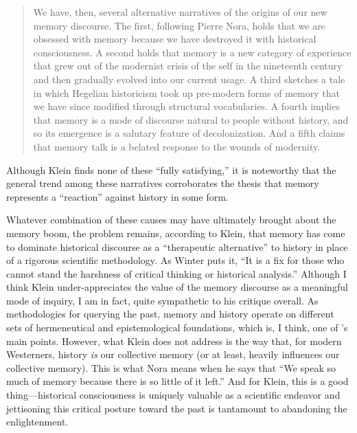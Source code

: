 \begin{quote} We have, then, several alternative narratives of the origins of our new memory discourse. The first, following Pierre Nora, holds that we are obsessed with memory because we have destroyed it with historical consciousness. A second holds that memory is a new category of experience that grew out of the modernist crisis of the self in the nineteenth century and then gradually evolved into our current usage. A third sketches a tale in which Hegelian historicism took up pre-modern forms of memory that we have since modified through structural vocabularies. A fourth implies that memory is a mode of discourse natural to people without history, and so its emergence is a salutary feature of decolonization. And a fifth claims that memory talk is a belated response to the wounds of modernity.\autocite[134]{klein_klein2011} \end{quote}  

Although Klein finds none of these ``fully satisfying,'' it is noteworthy that the general trend among these narratives corroborates the thesis that memory represents a ``reaction'' against history in some form.  

Whatever combination of these causes may have ultimately brought about the memory boom, the problem remains, according to Klein, that memory has come to dominate historical discourse as a ``therapeutic alternative'' to history in place of a rigorous scientific methodology.\autocite[137]{klein2011} As Winter puts it, ``It is a fix for those who cannot stand the harshness of critical thinking or historical analysis.''\autocite[283 (summarizing Klein)]{winter2006} Although I think Klein under-appreciates the value of the memory discourse as a meaningful mode of inquiry, I am in fact, quite sympathetic to his critique overall. As methodologies for querying the past, memory and history operate on different sets of hermeneutical and epistemological foundations, which is, I think, one of \yerushalmi's main points. 
%
%
However, what Klein does not address is the way that, for modern Westerners, history \emph{is} our collective memory (or at least, heavily influences our collective memory). This is what Nora means when he says that ``We speak so much of memory because there is so little of it left.''\autocite[7]{nora_representations1989} And for Klein, this is a good thing---historical consciousness is uniquely valuable as a scientific endeavor and jettisoning this critical posture toward the past is tantamount to abandoning the enlightenment.  

